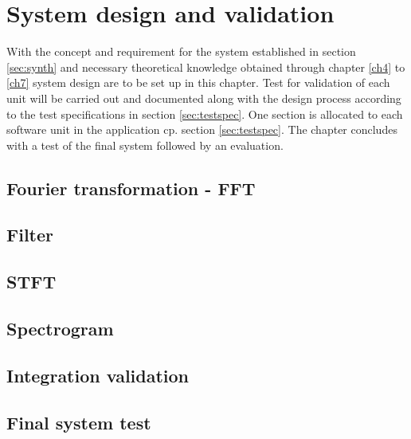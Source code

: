 \chapter{System design and validation} \label{ch8}
With the concept and requirement for the system established in section \ref{sec:synth} and necessary theoretical knowledge obtained through chapter \ref{ch4} to \ref{ch7} system design are to be set up in this chapter. Test for validation of each unit will be carried out and documented along with the design process according to the test specifications in section \ref{sec:testspec}. One section is allocated to each software unit in the application cp. section \ref{sec:testspec}. The chapter concludes with a test of the final system followed by an evaluation.  \\

\section{Fourier transformation - FFT}

\section{Filter}


\section{STFT}

\section{Spectrogram}

\section{Integration validation}

\section{Final system test}

